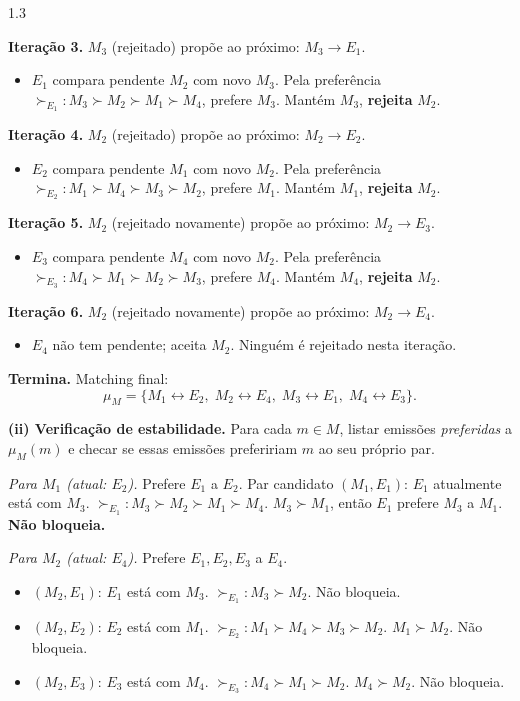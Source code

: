 \documentclass[11pt,addpoints]{exam}
\begin{document}
\begin{spacing}{1.3}
\begin{questions}
\begin{parts}
\begin{solution}
\textbf{Iteração 3.} $M_3$ (rejeitado) propõe ao próximo: $M_3 \to E_1$.
\begin{itemize}[noitemsep,topsep=0pt]
    \item $E_1$ compara pendente $M_2$ com novo $M_3$. Pela preferência $\succ_{E_1}: M_3 \succ M_2 \succ M_1 \succ M_4$, prefere $M_3$. Mantém $M_3$, \textbf{rejeita} $M_2$.
\end{itemize}

\textbf{Iteração 4.} $M_2$ (rejeitado) propõe ao próximo: $M_2 \to E_2$.
\begin{itemize}[noitemsep,topsep=0pt]
    \item $E_2$ compara pendente $M_1$ com novo $M_2$. Pela preferência $\succ_{E_2}: M_1 \succ M_4 \succ M_3 \succ M_2$, prefere $M_1$. Mantém $M_1$, \textbf{rejeita} $M_2$.
\end{itemize}

\textbf{Iteração 5.} $M_2$ (rejeitado novamente) propõe ao próximo: $M_2 \to E_3$.
\begin{itemize}[noitemsep,topsep=0pt]
    \item $E_3$ compara pendente $M_4$ com novo $M_2$. Pela preferência $\succ_{E_3}: M_4 \succ M_1 \succ M_2 \succ M_3$, prefere $M_4$. Mantém $M_4$, \textbf{rejeita} $M_2$.
\end{itemize}

\textbf{Iteração 6.} $M_2$ (rejeitado novamente) propõe ao próximo: $M_2 \to E_4$.
\begin{itemize}[noitemsep,topsep=0pt]
    \item $E_4$ não tem pendente; aceita $M_2$. Ninguém é rejeitado nesta iteração.
\end{itemize}

\textbf{Termina.} Matching final:
\[
    \boxed{\mu_M = \{M_1 \leftrightarrow E_2,\; M_2 \leftrightarrow E_4,\; M_3 \leftrightarrow E_1,\; M_4 \leftrightarrow E_3\}.}
\]

\textbf{(ii) Verificação de estabilidade.} Para cada $m \in M$, listar emissões \emph{preferidas} a $\mu_M(m)$ e checar se essas emissões prefeririam $m$ ao seu próprio par.

\emph{Para $M_1$ (atual: $E_2$).} Prefere $E_1$ a $E_2$. Par candidato $(M_1, E_1)$: $E_1$ atualmente está com $M_3$. $\succ_{E_1}: M_3 \succ M_2 \succ M_1 \succ M_4$. $M_3 \succ M_1$, então $E_1$ prefere $M_3$ a $M_1$. \textbf{Não bloqueia.}

\emph{Para $M_2$ (atual: $E_4$).} Prefere $E_1, E_2, E_3$ a $E_4$.
\begin{itemize}[noitemsep,topsep=0pt]
    \item $(M_2, E_1)$: $E_1$ está com $M_3$. $\succ_{E_1}: M_3 \succ M_2$. Não bloqueia.
    \item $(M_2, E_2)$: $E_2$ está com $M_1$. $\succ_{E_2}: M_1 \succ M_4 \succ M_3 \succ M_2$. $M_1 \succ M_2$. Não bloqueia.
    \item $(M_2, E_3)$: $E_3$ está com $M_4$. $\succ_{E_3}: M_4 \succ M_1 \succ M_2$. $M_4 \succ M_2$. Não bloqueia.
\end{itemize}


\end{solution}
\end{parts}
\end{questions}
\end{spacing}
\end{document}
